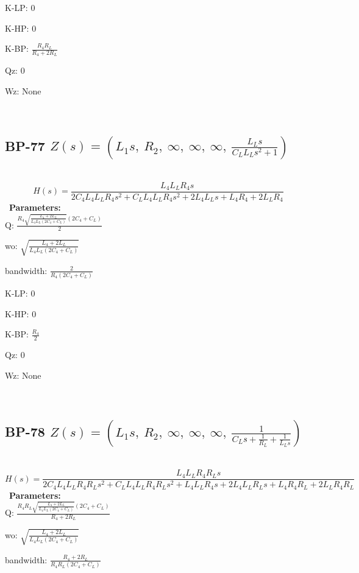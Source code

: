 \documentclass{article}
\begin{document}
K-LP: $0$\ 

K-HP: $0$\ 

K-BP: $\frac{R_{4} R_{L}}{R_{4} + 2 R_{L}}$\ 

Qz: $0$\ 

Wz: $\text{None}$\ 

\ 

\subsection{BP-77 $Z(s) = \left( L_{1} s, \  R_{2}, \  \infty, \  \infty, \  \infty, \  \frac{L_{L} s}{C_{L} L_{L} s^{2} + 1}\right)$ } \ 
\textbf{\[H(s) = \frac{L_{4} L_{L} R_{4} s}{2 C_{4} L_{4} L_{L} R_{4} s^{2} + C_{L} L_{4} L_{L} R_{4} s^{2} + 2 L_{4} L_{L} s + L_{4} R_{4} + 2 L_{L} R_{4}}\] } \ 
\textbf{Parameters:}\\ 

Q: $\frac{R_{4} \sqrt{\frac{L_{4} + 2 L_{L}}{L_{4} L_{L} \left(2 C_{4} + C_{L}\right)}} \left(2 C_{4} + C_{L}\right)}{2}$\ 

wo: $\sqrt{\frac{L_{4} + 2 L_{L}}{L_{4} L_{L} \left(2 C_{4} + C_{L}\right)}}$\ 

bandwidth: $\frac{2}{R_{4} \left(2 C_{4} + C_{L}\right)}$\ 

K-LP: $0$\ 

K-HP: $0$\ 

K-BP: $\frac{R_{4}}{2}$\ 

Qz: $0$\ 

Wz: $\text{None}$\ 

\ 

\subsection{BP-78 $Z(s) = \left( L_{1} s, \  R_{2}, \  \infty, \  \infty, \  \infty, \  \frac{1}{C_{L} s + \frac{1}{R_{L}} + \frac{1}{L_{L} s}}\right)$ } \ 
\textbf{\[H(s) = \frac{L_{4} L_{L} R_{4} R_{L} s}{2 C_{4} L_{4} L_{L} R_{4} R_{L} s^{2} + C_{L} L_{4} L_{L} R_{4} R_{L} s^{2} + L_{4} L_{L} R_{4} s + 2 L_{4} L_{L} R_{L} s + L_{4} R_{4} R_{L} + 2 L_{L} R_{4} R_{L}}\] } \ 
\textbf{Parameters:}\\ 

Q: $\frac{R_{4} R_{L} \sqrt{\frac{L_{4} + 2 L_{L}}{L_{4} L_{L} \left(2 C_{4} + C_{L}\right)}} \left(2 C_{4} + C_{L}\right)}{R_{4} + 2 R_{L}}$\ 

wo: $\sqrt{\frac{L_{4} + 2 L_{L}}{L_{4} L_{L} \left(2 C_{4} + C_{L}\right)}}$\ 

bandwidth: $\frac{R_{4} + 2 R_{L}}{R_{4} R_{L} \left(2 C_{4} + C_{L}\right)}$\ 
\end{document}
